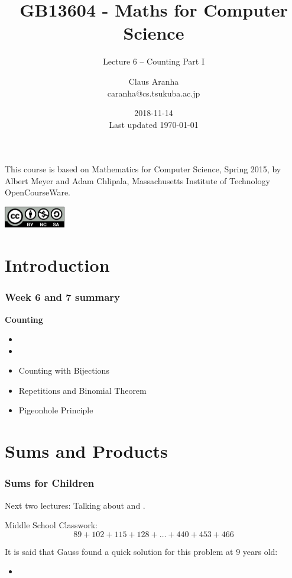 \documentclass{beamer}
\title[GB13604]{GB13604 - Maths for Computer Science}
\subtitle[]{Lecture 6 -- Counting Part I}
\author[Claus Aranha]{Claus Aranha\\{\footnotesize caranha@cs.tsukuba.ac.jp}}
\institute[COINS]{College of Information Science}
\date[2018-11-14]{2018-11-14\\{\tiny Last updated \today}}
\begin{document}
\begin{frame}
  \maketitle

  \begin{center}
    {\smaller This course is based on Mathematics for Computer Science, Spring
    2015, by Albert Meyer and Adam Chlipala, Massachusetts Institute
    of Technology OpenCourseWare.}
    
    \includegraphics[width=0.2\textwidth]{../img/by-nc-sa}
  \end{center}
\end{frame}

\section{Introduction}

\begin{frame}
  \frametitle{Week 6 and 7 summary}

  {\larger
    {\bf Counting}

    \bigskip

    \begin{itemize}
    \item {}
    \item {}
    \item \alert{Counting with Bijections}
    \item \alert{Repetitions and Binomial Theorem}
    \item \alert{Pigeonhole Principle}
    \end{itemize}
  }
\end{frame}

\section{Sums and Products}

\begin{frame}
  \frametitle{Sums for Children}
  
  {\larger
    Next two lectures: Talking about  and .
    
    \bigskip
    
    \begin{block}{Middle School Classwork:}
      \begin{equation*}
        89 + 102 + 115 + 128 + \ldots + 440 + 453 + 466
      \end{equation*}
    \end{block}

    \bigskip      
    It is said that \alert{Gauss} found a quick solution for this
    problem at \alert{9 years old}:
    \begin{itemize}
    \item {}
    \end{itemize}
  }
\end{frame}
\end{document}
